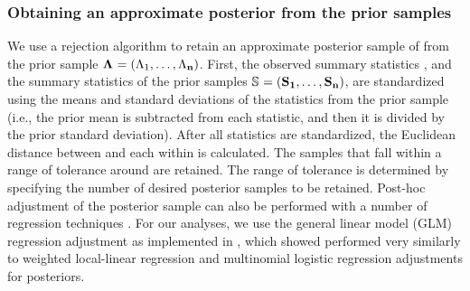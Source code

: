 \documentclass[letterpaper,12pt]{article}
\begin{document}
\begin{linenumbers}
\subsubsection*{Obtaining an approximate posterior from the prior samples}
We use a rejection algorithm to retain an approximate posterior sample of
\paramSampleVector{} from the prior sample
$\boldsymbol{\Lambda_{}} = (\Lambda_{1}, \ldots, \Lambda_{\mathbf{n}})$.
First, the observed summary statistics \ssVectorObs, and the summary statistics
of the prior samples 
$\ssMatrix = (\ssVector{1}, \ldots, \ssVector{\numPriorSamples})$,
are standardized using the means and standard deviations of the statistics from
the prior sample (i.e., the prior mean is subtracted from each statistic, and then
it is divided by the prior standard deviation).
After all statistics are standardized, the Euclidean distance between
\ssVectorObs and each \ssVector{} within \ssMatrix is calculated.
The samples that fall within a range of tolerance \tol around \ssVectorObs
are retained.
The range of tolerance is determined by specifying the number of desired
posterior samples to be retained.
Post-hoc adjustment of the posterior sample can also be performed with a number
of regression techniques \citep{Beaumont2002,Blum2009,Leuenberger2010}.
For our analyses, we use the general linear model (GLM) regression adjustment
\citep{Leuenberger2010} as implemented in \abctoolbox
\citep[v1.1;][]{ABCtoolbox}, which \citet{Oaks2012} showed performed very
similarly to weighted local-linear regression and multinomial logistic
regression adjustments \citep{Beaumont2002} for \msb posteriors.



\end{linenumbers}
\end{document}

